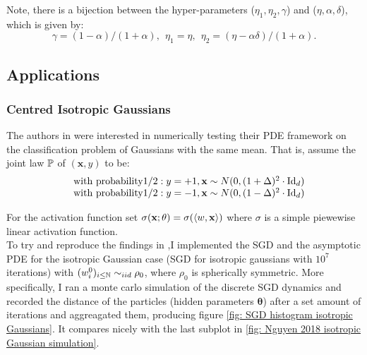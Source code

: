 \documentclass{article}
\begin{document}
Note, there is a bijection between the hyper-parameters ($\eta_1,\eta_2,\gamma$) and ($\eta,\alpha,\delta$), which is given by:
\begin{equation}\label{eq:parabijection}
    \gamma =(1-\alpha)/(1+\alpha), \ \ \eta_1 = \eta,   \ \  \eta_2 = (\eta-\alpha\delta)/(1+\alpha).
\end{equation}


\subsection{Applications}

\subsubsection{Centred Isotropic Gaussians}

The authors in \cite{Mei_2018} were interested in numerically testing their PDE framework on the classification problem of Gaussians with the same mean. That is, assume the joint law $ \mathbb{P}$ of $(\mathbf{x}, y) $ to be:
\begin{equation}
\begin{array}{cc}
& \text{with probability}  1/2: y = +1, \mathbf{x}\sim N(0, (1+\Delta)^{2}\cdot\operatorname{Id}_{d})\\
& \text{with probability} 1/2: y = -1, \mathbf{x}\sim N(0, (1-\Delta)^{2}\cdot\operatorname{Id}_{d})
\end{array}
\end{equation}

For the activation function set $ \sigma( \mathbf{x}; \mathbf{\theta}) = \sigma(\langle w,  \mathbf{x}\rangle)$ where $ \sigma$ is a simple piewewise linear activation function.\\

To try and reproduce the findings in \cite{Mei_2018},I implemented the SGD and the asymptotic PDE for the isotropic Gaussian case (SGD for isotropic gaussians with $10^7$ iterations) with $(w_i^0 )_{i\leq\mathbb{N}} \sim_{iid} \rho_0$, where $\rho_0$ is spherically symmetric. More specifically, I ran a monte carlo simulation of the discrete SGD dynamics and recorded the distance of the particles (hidden parameters $ \mathbf{\theta}$) after a set amount of iterations and aggreagated them, producing figure \ref{fig: SGD histogram isotropic Gaussians}. It compares nicely with the last subplot in \ref{fig: Nguyen 2018 isotropic Gaussian simulation}. 
\end{document}
